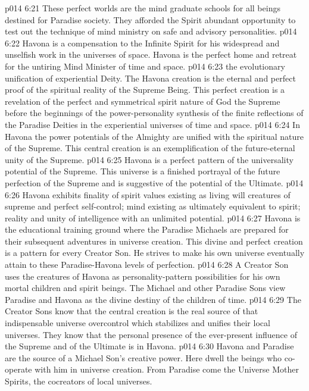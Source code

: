\vs p014 6:21 These perfect worlds are the mind graduate schools for all beings destined for Paradise society. They afforded the Spirit abundant opportunity to test out the technique of mind ministry on safe and advisory personalities.
\vs p014 6:22 Havona is a compensation to the Infinite Spirit for his widespread and unselfish work in the universes of space. Havona is the perfect home and retreat for the untiring Mind Minister of time and space.
\pc \vs p014 6:23 \bibnobreakspace {}the evolutionary unification of experiential Deity. The Havona creation is the eternal and perfect proof of the spiritual reality of the Supreme Being. This perfect creation is a revelation of the perfect and symmetrical spirit nature of God the Supreme before the beginnings of the power\hyp{}personality synthesis of the finite reflections of the Paradise Deities in the experiential universes of time and space.
\vs p014 6:24 In Havona the power potentials of the Almighty are unified with the spiritual nature of the Supreme. This central creation is an exemplification of the future\hyp{}eternal unity of the Supreme.
\vs p014 6:25 Havona is a perfect pattern of the universality potential of the Supreme. This universe is a finished portrayal of the future perfection of the Supreme and is suggestive of the potential of the Ultimate.
\vs p014 6:26 Havona exhibits finality of spirit values existing as living will creatures of supreme and perfect self\hyp{}control; mind existing as ultimately equivalent to spirit; reality and unity of intelligence with an unlimited potential.
\pc \vs p014 6:27 \bibnobreakspace {} Havona is the educational training ground where the Paradise Michaels are prepared for their subsequent adventures in universe creation. This divine and perfect creation is a pattern for every Creator Son. He strives to make his own universe eventually attain to these Paradise\hyp{}Havona levels of perfection.
\vs p014 6:28 A Creator Son uses the creatures of Havona as personality\hyp{}pattern possibilities for his own mortal children and spirit beings. The Michael and other Paradise Sons view Paradise and Havona as the divine destiny of the children of time.
\vs p014 6:29 The Creator Sons know that the central creation is the real source of that indispensable universe overcontrol which stabilizes and unifies their local universes. They know that the personal presence of the ever\hyp{}present influence of the Supreme and of the Ultimate is in Havona.
\vs p014 6:30 Havona and Paradise are the source of a Michael Son’s creative power. Here dwell the beings who co\hyp{}operate with him in universe creation. From Paradise come the Universe Mother Spirits, the cocreators of local universes.
